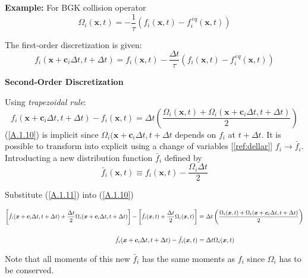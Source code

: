 \documentclass[draft]{article}
\begin{document}
\vspace{1cm}
{\large \textbf{Example:}} For BGK collision operator
\begin{equation*}
	\Omega_i(\bm{x}, t) = -\frac{1}{\tau}(f_i(\bm{x}, t) - f_i^{\, eq}(\bm{x}, t))
\end{equation*}

The first-order discretization is given:
\begin{equation}
	f_i(\bm{x} + \bm{c}_i \Delta t, t + \Delta t) = f_i(\bm{x}, t) - \frac{\Delta t}{\tau} (f_i(\bm{x}, t) - f_i^{\, eq} (\bm{x}, t))
\end{equation}
\clearpage

{\large\textbf{Second-Order Discretization}}

Using \textit{trapezoidal rule}:
\begin{equation}
	f_i(\bm{x} + \bm{c}_i \Delta t, t + \Delta t) - f_i(\bm{x}, t) = \Delta t \left ( \frac{\Omega_i(\bm{x}, t) + \Omega_i(\bm{x} + \bm{c}_i \Delta t, t + \Delta t)}{2} \right ) \label{A.1.10}
\end{equation}
(\ref{A.1.10}) is implicit since $\Omega_i(\bm{x} + \bm{c}_i \Delta t, t + \Delta t$ depends on $f_i$ at $t + \Delta t$. It is possible to transform into explicit using a change of variables [\ref{ref:dellar}] $f_i \rightarrow \bar{f}_i$. Introducting a new distribution function $\bar{f}_i$ defined by
\begin{equation}
	\bar{f}_i(\bm{x}, t) \equiv f_i(\bm{x}, t) - \frac{\Omega_i \Delta t}{2} \label{A.1.11}
\end{equation} 

Substitute (\ref{A.1.11}) into (\ref{A.1.10})

\begin{align}
	\text{\small $\left [ \bar{f}_i(\bm{x} + \bm{c}_i \Delta t, t + \Delta t) + \frac{\Delta t}{2}\Omega_i(\bm{x} + \bm{c}_i \Delta t, t + \Delta t) \right ] - \left [ \bar{f}_i(\bm{x}, t) + \frac{\Delta t}{2}\Omega_i(\bm{x}, t) \right ]$} &= \text{\small $\Delta t \left ( \frac{\Omega_i(\bm{x}, t) + \Omega_i(\bm{x} + \bm{c}_i \Delta t, t + \Delta t)}{2} \right )$} \notag \\
	\notag \\
	\bar{f}_i(\bm{x} + \bm{c}_i \Delta t, t + \Delta t) - \bar{f}_i(\bm{x}, t) &= \Delta t \Omega_i(\bm{x}, t) \label{A.1.12}
\end{align}

Note that all moments of this new $\bar{f}_i$ has the same moments as $f_i$ since $\Omega_i$ has to be conserved.
\end{document}
